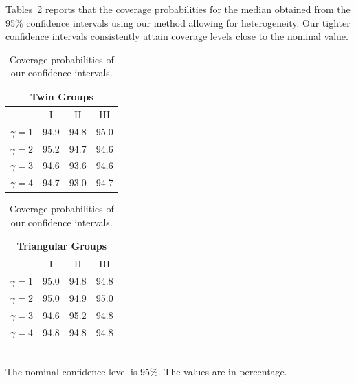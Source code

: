 \documentclass[12pt]{article}
\theoremstyle{remark}
\begin{document}



Tables~\ref{tab:covprob} reports that the coverage probabilities for the median obtained from the 95\% confidence intervals using our method allowing for heterogeneity. Our tighter confidence intervals consistently attain coverage levels close to the nominal value.


\begin{table}[!h]
	\centering
	\caption{Coverage probabilities of our confidence intervals. }
	{\begin{tabular}{cccc}
			\multicolumn{4}{c}{Twin Groups}\\
			\hline
			& I & II & III \\
			\hline
			$\gamma=1$ & 94.9 & 94.8 & 95.0 \\
			$\gamma=2$ & 95.2 & 94.7 & 94.6 \\
			$\gamma=3$ & 94.6 & 93.6 & 94.6 \\
			$\gamma=4$ & 94.7 & 93.0 & 94.7 \\
			\hline
		\end{tabular}
		\quad\qquad
		\begin{tabular}{cccc}
			\multicolumn{4}{c}{Triangular Groups}\\
			\hline
			& I & II & III \\
			\hline
			$\gamma=1$ & 95.0 & 94.8 & 94.8 \\
			$\gamma=2$ & 95.0 & 94.9 & 95.0 \\
			$\gamma=3$ & 94.6 & 95.2 & 94.8 \\
			$\gamma=4$ & 94.8 & 94.8 & 94.8 \\
			\hline
		\end{tabular}\\
		The nominal confidence level is 95\%. The values are in percentage.
	}
	\label{tab:covprob}
\end{table}




\end{document}
